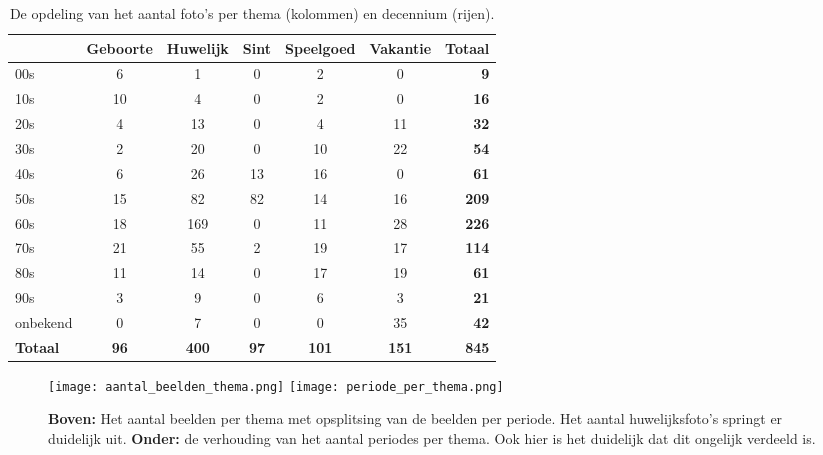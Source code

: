 \begin{table}
	\centering
	\renewcommand\arraystretch{1.2}
	\begin{tabular}{l|ccccc|r}
		\toprule
		& Geboorte & Huwelijk & Sint & Speelgoed & Vakantie & Totaal \\
		\midrule
		00s & 6 & 1 & 0 &2 & 0 & \textbf{9} \\
		10s & 10 & 4 & 0 & 2 & 0 & \textbf{16} \\
		20s & 4 & 13 & 0 & 4 & 11 & \textbf{32} \\
		30s & 2 & 20 & 0 & 10 & 22 & \textbf{54} \\
		40s & 6 & 26 & 13 & 16 & 0 & \textbf{61} \\
		50s & 15 & 82 & 82 & 14 & 16 & \textbf{209} \\
		60s & 18 & 169 & 0 & 11 & 28 & \textbf{226} \\
		70s & 21 & 55 & 2 & 19 & 17 & \textbf{114} \\
		80s & 11 & 14 & 0 & 17 & 19 & \textbf{61} \\
		90s & 3 & 9 & 0 & 6 & 3 & \textbf{21} \\
		onbekend & 0 & 7 & 0 & 0 & 35 & \textbf{42} \\
		\midrule
		\textbf{Totaal} & \textbf{96} & \textbf{400} & \textbf{97} & \textbf{101} & \textbf{151} & \textbf{845} \\
		\bottomrule
	\end{tabular}
	\caption[Opdeling van het aantal foto’s per thema en decennium]{De opdeling van het aantal foto’s per thema (kolommen) en decennium (rijen).}
	\label{tab:analyse-dataset}
\end{table}

\begin{figure}
	\centering
	\texttt{[image: aantal\_beelden\_thema.png]}\hfill
	\texttt{[image: periode\_per\_thema.png]}\hfill
	\caption[Staafdiagrammen met het aantal beelden per thema en de verhouding van het aantal periodes per thema]{\textbf{Boven:} Het aantal beelden per thema met opsplitsing van de beelden per periode. Het aantal huwelijksfoto's springt er duidelijk uit. \textbf{Onder:} de verhouding van het aantal periodes per thema. Ook hier is het duidelijk dat dit ongelijk verdeeld is.}
	\label{fig:verhouding-beelden-thema}
\end{figure}

